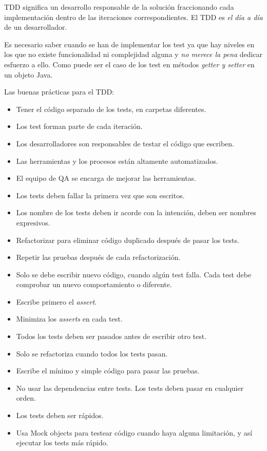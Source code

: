 \par TDD significa un desarrollo responsable de la solución fraccionando cada implementación dentro de las iteraciones correspondientes. El TDD es \emph{el día a día} de un desarrollador.

\par Es necesario saber cuando se han de implementar los test ya que hay niveles en los que no existe funcionalidad ni complejidad alguna y \emph{no merece la pena} dedicar esfuerzo a ello. Como puede ser el caso de los test en métodos \emph{getter y setter} en un objeto Java.

\par Las buenas prácticas para el TDD:
\begin{itemize}
	\item Tener el código separado de los tests, en carpetas diferentes.
	\item Los test forman parte de cada iteración.
	\item Los desarrolladores son responsables de testar el código que escriben.
	\item Las herramientas y los procesos están altamente automatizados.
	\item El equipo de QA se encarga de mejorar las herramientas.
	\item Los tests deben fallar la primera vez que son escritos.
	\item Los nombre de los tests deben ir acorde con la intención, deben ser nombres expresivos.
	\item Refactorizar para eliminar código duplicado después de pasar los tests.
	\item Repetir las pruebas después de cada refactorización.
	\item Solo se debe escribir nuevo código, cuando algún test falla. Cada test debe comprobar un nuevo comportamiento o diferente.
	\item Escribe primero el \emph{assert}.
	\item Minimiza los \emph{asserts} en cada test.
	\item Todos los tests deben ser pasados antes de escribir otro test.
	\item Solo se refactoriza cuando todos los tests pasan.
	\item Escribe el mínimo y simple código para pasar las pruebas.
	\item No usar las dependencias entre tests. Los tests deben pasar en cualquier orden.
	\item Los tests deben ser rápidos.
	\item Usa Mock objects para testear código cuando haya alguna limitación, y así ejecutar los tests más rápido.
\end{itemize}

